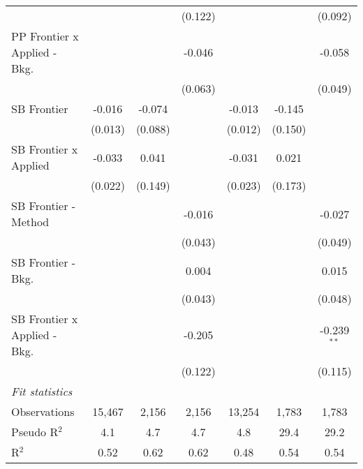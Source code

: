 \begin{tabular}{lcccccc}
                                  &               &              & (0.122)      &               &               & (0.092)\\   
   PP Frontier x Applied - Bkg.   &               &              & -0.046       &               &               & -0.058\\   
                                  &               &              & (0.063)      &               &               & (0.049)\\   
   SB Frontier                    & -0.016        & -0.074       &              & -0.013        & -0.145        &   \\   
                                  & (0.013)       & (0.088)      &              & (0.012)       & (0.150)       &   \\   
   SB Frontier x Applied          & -0.033        & 0.041        &              & -0.031        & 0.021         &   \\   
                                  & (0.022)       & (0.149)      &              & (0.023)       & (0.173)       &   \\   
   SB Frontier - Method           &               &              & -0.016       &               &               & -0.027\\   
                                  &               &              & (0.043)      &               &               & (0.049)\\   
   SB Frontier - Bkg.             &               &              & 0.004        &               &               & 0.015\\   
                                  &               &              & (0.043)      &               &               & (0.048)\\   
   SB Frontier x Applied - Bkg.   &               &              & -0.205       &               &               & -0.239$^{**}$\\   
                                  &               &              & (0.122)      &               &               & (0.115)\\   
   \midrule
   \emph{Fit statistics}\\
   Observations                   & 15,467        & 2,156        & 2,156        & 13,254        & 1,783         & 1,783\\  
   Pseudo R$^2$                   & 4.1           & 4.7          & 4.7          & 4.8           & 29.4          & 29.2\\  
   R$^2$                          & 0.52          & 0.62         & 0.62         & 0.48          & 0.54          & 0.54\\  
   

\end{tabular}
